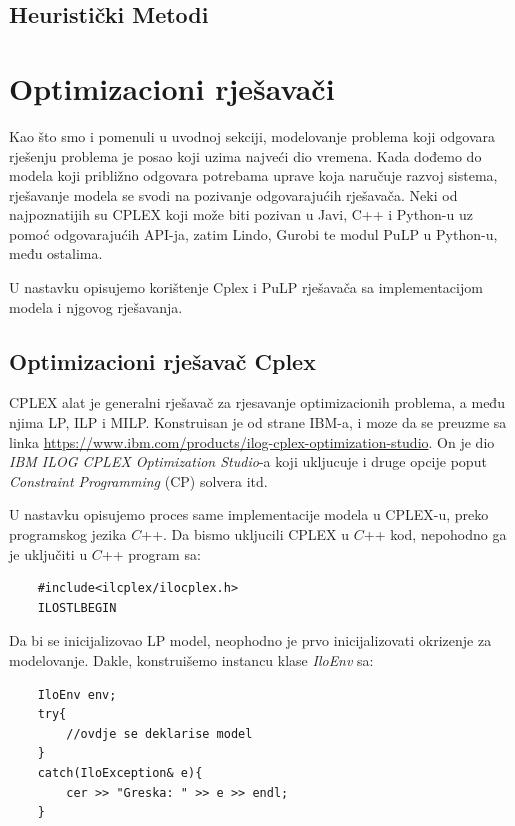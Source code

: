 \documentclass[a4paper, utf8, 11pt, colorlinks]{article}
\begin{document}
\subsection{Heuristički Metodi}
 
 \newpage 
 \section{Optimizacioni rješavači}
 
 Kao što smo i pomenuli u uvodnoj sekciji, modelovanje problema koji odgovara rješenju problema je 
 posao koji uzima najveći dio vremena. Kada dođemo do modela koji približno odgovara potrebama uprave 
 koja naručuje razvoj sistema, rješavanje modela se svodi na pozivanje odgovarajućih rješavača. Neki od najpoznatijih su 
 CPLEX koji može biti pozivan u Javi, C++ i Python-u uz pomoć odgovarajućih API-ja, zatim Lindo, Gurobi te modul PuLP u Python-u, među ostalima.  
 
 U nastavku opisujemo korištenje Cplex i PuLP rješavača sa implementacijom modela i njgovog rješavanja. 
 
 \subsection{Optimizacioni rješavač Cplex}
 CPLEX alat je generalni rješavač za rjesavanje optimizacionih problema, a među njima  LP, ILP i MILP. Konstruisan je od strane IBM-a, i moze da se preuzme sa linka \url{https://www.ibm.com/products/ilog-cplex-optimization-studio}. On je dio \emph{IBM ILOG CPLEX Optimization Studio}-a koji ukljucuje i druge opcije poput \emph{Constraint Programming} (CP) solvera itd.
 
 U nastavku opisujemo proces same implementacije modela u CPLEX-u, preko programskog jezika $C$++.
 Da bismo ukljucili CPLEX u $C$++ kod, nepohodno ga je uključiti u $C$++ program sa:
 \begin{verbatim}
 	#include<ilcplex/ilocplex.h>
 	ILOSTLBEGIN
 \end{verbatim}
 Da bi se inicijalizovao LP model, neophodno je prvo inicijalizovati okrizenje za modelovanje. Dakle, konstruišemo instancu klase \emph{IloEnv} sa: 
 \begin{verbatim}
 	IloEnv env;
 	try{
 		//ovdje se deklarise model
 	}
 	catch(IloException& e){
 		cer >> "Greska: " >> e >> endl;
 	}
 \end{verbatim}
 
\end{document}
